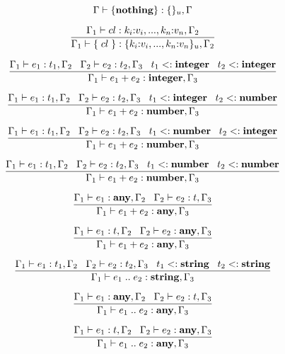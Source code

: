 \[
\Gamma \vdash \{ \mathbf{nothing} \}:\{ \}_{u}, \Gamma 
\]

\[
\dfrac{\Gamma_{1} \vdash cl:k_{i}{:}v_{i}, ..., k_{n}{:}v_{n}, \Gamma_{2}}
      {\Gamma_{1} \vdash \{ \; cl \; \}:\{ k_{i}{:}v_{i}, ..., k_{n}{:}v_{n} \}_{u}, \Gamma_{2}}
\]

\[
\dfrac{\Gamma_{1} \vdash e_{1}:t_{1}, \Gamma_{2} \;\;\;
       \Gamma_{2} \vdash e_{2}:t_{2}, \Gamma_{3} \;\;\;
       t_{1} <: \mathbf{integer} \;\;\;
       t_{2} <: \mathbf{integer}}
      {\Gamma_{1} \vdash e_{1} + e_{2}:\mathbf{integer}, \Gamma_{3}}
\]

\[
\dfrac{\Gamma_{1} \vdash e_{1}:t_{1}, \Gamma_{2} \;\;\;
       \Gamma_{2} \vdash e_{2}:t_{2}, \Gamma_{3} \;\;\;
       t_{1} <: \mathbf{integer} \;\;\;
       t_{2} <: \mathbf{number}}
      {\Gamma_{1} \vdash e_{1} + e_{2}:\mathbf{number}, \Gamma_{3}}
\]

\[
\dfrac{\Gamma_{1} \vdash e_{1}:t_{1}, \Gamma_{2} \;\;\;
       \Gamma_{2} \vdash e_{2}:t_{2}, \Gamma_{3} \;\;\;
       t_{1} <: \mathbf{number} \;\;\;
       t_{2} <: \mathbf{integer}}
      {\Gamma_{1} \vdash e_{1} + e_{2}:\mathbf{number}, \Gamma_{3}}
\]

\[
\dfrac{\Gamma_{1} \vdash e_{1}:t_{1}, \Gamma_{2} \;\;\;
       \Gamma_{2} \vdash e_{2}:t_{2}, \Gamma_{3} \;\;\;
       t_{1} <: \mathbf{number} \;\;\;
       t_{2} <: \mathbf{number}}
      {\Gamma_{1} \vdash e_{1} + e_{2}:\mathbf{number}, \Gamma_{3}}
\]

\[
\dfrac{\Gamma_{1} \vdash e_{1}:\mathbf{any}, \Gamma_{2} \;\;\;
       \Gamma_{2} \vdash e_{2}:t, \Gamma_{3}}
      {\Gamma_{1} \vdash e_{1} + e_{2}:\mathbf{any}, \Gamma_{3}}
\]

\[
\dfrac{\Gamma_{1} \vdash e_{1}:t, \Gamma_{2} \;\;\;
       \Gamma_{2} \vdash e_{2}:\mathbf{any}, \Gamma_{3}}
      {\Gamma_{1} \vdash e_{1} + e_{2}:\mathbf{any}, \Gamma_{3}}
\]

\[
\dfrac{\Gamma_{1} \vdash e_{1}:t_{1}, \Gamma_{2} \;\;\;
       \Gamma_{2} \vdash e_{2}:t_{2}, \Gamma_{3} \;\;\;
       t_{1} <: \mathbf{string} \;\;\;
       t_{2} <: \mathbf{string}}
      {\Gamma_{1} \vdash e_{1} \; {..} \; e_{2}:\mathbf{string}, \Gamma_{3}}
\]

\[
\dfrac{\Gamma_{1} \vdash e_{1}:\mathbf{any}, \Gamma_{2} \;\;\;
       \Gamma_{2} \vdash e_{2}:t, \Gamma_{3}}
      {\Gamma_{1} \vdash e_{1} \; {..} \; e_{2}:\mathbf{any}, \Gamma_{3}}
\]

\[
\dfrac{\Gamma_{1} \vdash e_{1}:t, \Gamma_{2} \;\;\;
       \Gamma_{2} \vdash e_{2}:\mathbf{any}, \Gamma_{3}}
      {\Gamma_{1} \vdash e_{1} \; {..} \; e_{2}:\mathbf{any}, \Gamma_{3}}
\]

